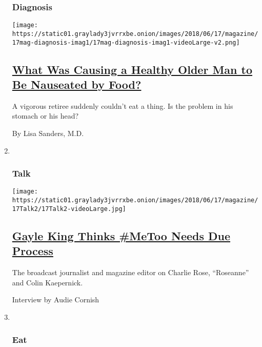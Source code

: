 \begin{enumerate}
{  \subsubsection{Diagnosis}\label{diagnosis}}

  \texttt{[image: https://static01.graylady3jvrrxbe.onion/images/2018/06/17/magazine/17mag-diagnosis-imag1/17mag-diagnosis-imag1-videoLarge-v2.png]}

  \hypertarget{what-was-causing-a-healthy-older-man-to-be-nauseated-by-food}{%
  \subsection{\texorpdfstring{\href{/2018/06/13/magazine/he-had-no-symptoms-except-he-felt-nauseated-all-the-time.html}{What
  Was Causing a Healthy Older Man to Be Nauseated by
  Food?}}{What Was Causing a Healthy Older Man to Be Nauseated by Food?}}\label{what-was-causing-a-healthy-older-man-to-be-nauseated-by-food}}

  A vigorous retiree suddenly couldn't eat a thing. Is the problem in
  his stomach or his head?

  By Lisa Sanders, M.D.
\item ~
  \hypertarget{talk}{%
  \subsubsection{Talk}\label{talk}}

  \texttt{[image: https://static01.graylady3jvrrxbe.onion/images/2018/06/17/magazine/17Talk2/17Talk2-videoLarge.jpg]}

  \hypertarget{gayle-king-thinks-metoo-needs-due-process}{%
  \subsection{\texorpdfstring{\href{/2018/06/12/magazine/gayle-king-thinks-metoo-needs-due-process.html}{Gayle
  King Thinks \#MeToo Needs Due
  Process}}{Gayle King Thinks \#MeToo Needs Due Process}}\label{gayle-king-thinks-metoo-needs-due-process}}

  The broadcast journalist and magazine editor on Charlie Rose,
  ``Roseanne'' and Colin Kaepernick.

  Interview by Audie Cornish
\item ~
  \hypertarget{eat}{%
  \subsubsection{Eat}\label{eat}}


\end{enumerate}
